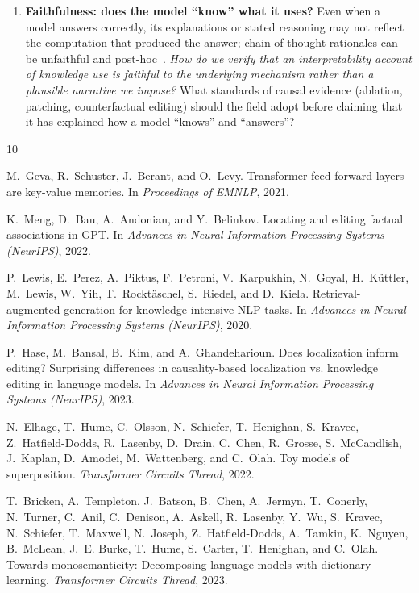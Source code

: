 \documentclass[11pt]{article}
\begin{document}
\begin{enumerate}[leftmargin=*,label=\textbf{Q\arabic*.}]
\item \textbf{Faithfulness: does the model ``know'' what it uses?} Even when a model answers correctly, its explanations or stated reasoning may not reflect the computation that produced the answer; chain-of-thought rationales can be unfaithful and post-hoc~\citep{turpin2023language}. \emph{How do we verify that an interpretability account of knowledge use is faithful to the underlying mechanism rather than a plausible narrative we impose?} What standards of causal evidence (ablation, patching, counterfactual editing) should the field adopt before claiming that it has explained how a model ``knows'' and ``answers''?

\end{enumerate}


\begin{thebibliography}{10}

M.~Geva, R.~Schuster, J.~Berant, and O.~Levy.
\newblock Transformer feed-forward layers are key-value memories.
\newblock In \emph{Proceedings of EMNLP}, 2021.

K.~Meng, D.~Bau, A.~Andonian, and Y.~Belinkov.
\newblock Locating and editing factual associations in GPT.
\newblock In \emph{Advances in Neural Information Processing Systems (NeurIPS)}, 2022.

P.~Lewis, E.~Perez, A.~Piktus, F.~Petroni, V.~Karpukhin, N.~Goyal, H.~K\"uttler, M.~Lewis, W.~Yih, T.~Rockt\"aschel, S.~Riedel, and D.~Kiela.
\newblock Retrieval-augmented generation for knowledge-intensive NLP tasks.
\newblock In \emph{Advances in Neural Information Processing Systems (NeurIPS)}, 2020.

P.~Hase, M.~Bansal, B.~Kim, and A.~Ghandeharioun.
\newblock Does localization inform editing? Surprising differences in causality-based localization vs. knowledge editing in language models.
\newblock In \emph{Advances in Neural Information Processing Systems (NeurIPS)}, 2023.

N.~Elhage, T.~Hume, C.~Olsson, N.~Schiefer, T.~Henighan, S.~Kravec, Z.~Hatfield-Dodds, R.~Lasenby, D.~Drain, C.~Chen, R.~Grosse, S.~McCandlish, J.~Kaplan, D.~Amodei, M.~Wattenberg, and C.~Olah.
\newblock Toy models of superposition.
\newblock \emph{Transformer Circuits Thread}, 2022.

T.~Bricken, A.~Templeton, J.~Batson, B.~Chen, A.~Jermyn, T.~Conerly, N.~Turner, C.~Anil, C.~Denison, A.~Askell, R.~Lasenby, Y.~Wu, S.~Kravec, N.~Schiefer, T.~Maxwell, N.~Joseph, Z.~Hatfield-Dodds, A.~Tamkin, K.~Nguyen, B.~McLean, J.~E. Burke, T.~Hume, S.~Carter, T.~Henighan, and C.~Olah.
\newblock Towards monosemanticity: Decomposing language models with dictionary learning.
\newblock \emph{Transformer Circuits Thread}, 2023.


\end{thebibliography}
\end{document}
